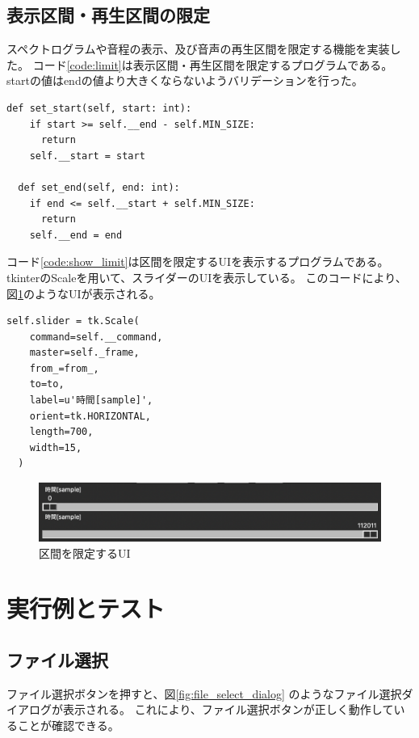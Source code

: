 \documentclass[a4paper,11pt]{jsarticle}
\begin{document}
\subsection{表示区間・再生区間の限定}

スペクトログラムや音程の表示、及び音声の再生区間を限定する機能を実装した。
コード\ref{code:limit}は表示区間・再生区間を限定するプログラムである。
startの値はendの値より大きくならないようバリデーションを行った。

\begin{lstlisting}[caption=表示区間・再生区間の限定,label=code:limit]
  def set_start(self, start: int):
    if start >= self.__end - self.MIN_SIZE:
      return
    self.__start = start

  def set_end(self, end: int):
    if end <= self.__start + self.MIN_SIZE:
      return
    self.__end = end
\end{lstlisting}

コード\ref{code:show_limit}は区間を限定するUIを表示するプログラムである。
tkinterのScaleを用いて、スライダーのUIを表示している。
このコードにより、図\ref{fig:sliders}のようなUIが表示される。

\begin{lstlisting}[caption=区間を限定するUI,label=code:show_limit]
  self.slider = tk.Scale(
    command=self.__command,
    master=self._frame,
    from_=from_,
    to=to,
    label=u'時間[sample]',
    orient=tk.HORIZONTAL,
    length=700,
    width=15,
  )
\end{lstlisting}

\begin{figure}[h]
\centering
\includegraphics[keepaspectratio, width = 13cm]
{./images/sliders.png}
\caption{区間を限定するUI}
\label{fig:sliders}
\end{figure}

\section{実行例とテスト}
\subsection{ファイル選択}
ファイル選択ボタンを押すと、図\ref{fig:file_select_dialog}
のようなファイル選択ダイアログが表示される。
これにより、ファイル選択ボタンが正しく動作していることが確認できる。
\end{document}
